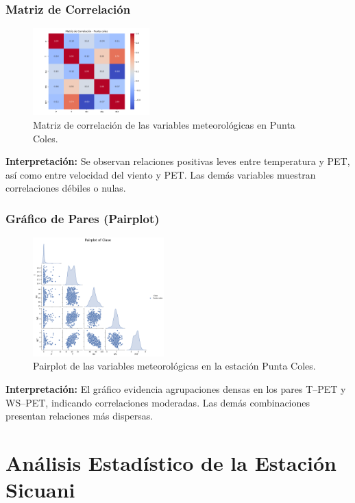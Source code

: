 \subsubsection*{Matriz de Correlación}
\begin{figure}[H]
\centering
\includegraphics[width=0.4\textwidth]{resultados/por_estacion_meteorologica/Punta_Coles/matriz_correlacion.png}
\caption{Matriz de correlación de las variables meteorológicas en Punta Coles.}
\label{fig:punta_coles_corr}
\end{figure}
\textbf{Interpretación:} Se observan relaciones positivas leves entre temperatura y PET, así como entre velocidad del viento y PET. Las demás variables muestran correlaciones débiles o nulas.

\subsubsection*{Gráfico de Pares (Pairplot)}
\begin{figure}[H]
\centering
\includegraphics[width=0.45\textwidth]{resultados/por_estacion_meteorologica/Punta_Coles/pairplot.png}
\caption{Pairplot de las variables meteorológicas en la estación Punta Coles.}
\label{fig:punta_coles_pairplot}
\end{figure}
\textbf{Interpretación:} El gráfico evidencia agrupaciones densas en los pares T–PET y WS–PET, indicando correlaciones moderadas. Las demás combinaciones presentan relaciones más dispersas.


\section{Análisis Estadístico de la Estación Sicuani}

